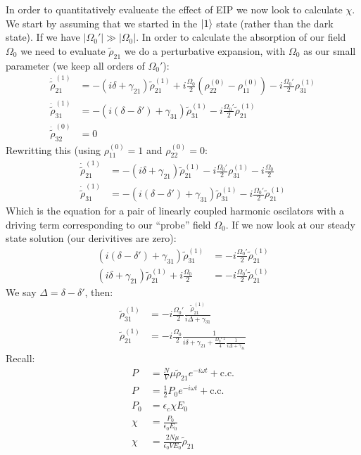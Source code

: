 In order to quantitatively evalueate the effect of EIP we now look to calculate $\chi$. We start by assuming that we started in the $\ket{1}$ state (rather than the dark state).
If we have $|\Omega_0'| \gg |\Omega_0|$. In order to calculate the absorption of our field $\Omega_0$ we need to evaluate $\tilde{\rho}_{21}$ we do a perturbative expansion, with $\Omega_0$ as our small parameter (we keep all orders of $\Omega_0'$):
\begin{align*}
	\dot{\tilde{\rho}}_{21}^{(1)} &= -(i\delta + \gamma_{21})\tilde{\rho}_{21}^{(1)} + i\frac{\Omega_0}{2}(\rho_{22}^{(0)} - \rho_{11}^{(0)}) - i\frac{\Omega_0'}{2}\rho_{31}^{(1)} \\
	\dot{\tilde{\rho}}_{31}^{(1)} &= -(i(\delta - \delta') + \gamma_{31})\tilde{\rho}_{31}^{(1)} - i\frac{\Omega_0'}{2}\tilde{\rho}_{21}^{(1)} \\
	\dot{\tilde{\rho}}_{32}^{(0)} &= 0
\end{align*}
Rewritting this (using $\rho_{11}^{(0)} = 1$ and $\rho_{22}^{(0)} = 0$:
\begin{align*}
	\dot{\tilde{\rho}}_{21}^{(1)} &= -(i\delta + \gamma_{21})\tilde{\rho}_{21}^{(1)} - i\frac{\Omega_0'}{2}\rho_{31}^{(1)} - i\frac{\Omega_0}{2} \\
	\dot{\tilde{\rho}}_{31}^{(1)} &= -(i(\delta - \delta') + \gamma_{31})\tilde{\rho}_{31}^{(1)} - i\frac{\Omega_0'}{2}\tilde{\rho}_{21}^{(1)}
\end{align*}
Which is the equation for a pair of linearly coupled harmonic oscilators with a driving term corresponding to our ``probe'' field $\Omega_0$.
If we now look at our steady state solution (our derivitives are zero):
\begin{align*}
	(i(\delta - \delta')+ \gamma_{31})\tilde{\rho}_{31}^{(1)} &= -i\frac{\Omega_0'}{2}\tilde{\rho}_{21}^{(1)} \\
	(i\delta + \gamma_{21})\tilde{\rho}_{21}^{(1)} + i\frac{\Omega_0}{2} &= -i\frac{\Omega_0'}{2}\tilde{\rho}_{21}^{(1)}
\end{align*}
We say $\Delta = \delta-\delta'$, then:
\begin{align*}
	\tilde{\rho}_{31}^{(1)} &= -i\frac{\Omega_0'}{2} \frac{\tilde{\rho}_{21}^{(1)}}{i\Delta + \gamma_{31}} \\
	\tilde{\rho}_{21}^{(1)} &= -i\frac{\Omega_0}{2}\frac{1}{i\delta + \gamma_{21} + \frac{\Omega_0'\ ^2}{4}\frac{1}{i\Delta + \gamma_{31}}}
\end{align*}
Recall:
\begin{align*}
	P &= \frac{N}{V} \mu \tilde{\rho}_{21}e^{-i\omega t} + \text{c.c.} \\
	P &= \frac{1}{2}P_0 e^{-i\omega t} + \text{c.c.} \\
	P_0 &= \epsilon_c \chi E_0 \\
	\chi &= \frac{P_0}{\epsilon_0 E_0} \\
	\chi &= \frac{2N\mu}{\epsilon_0 V E_0} \tilde{\rho}_{21}
\end{align*}
